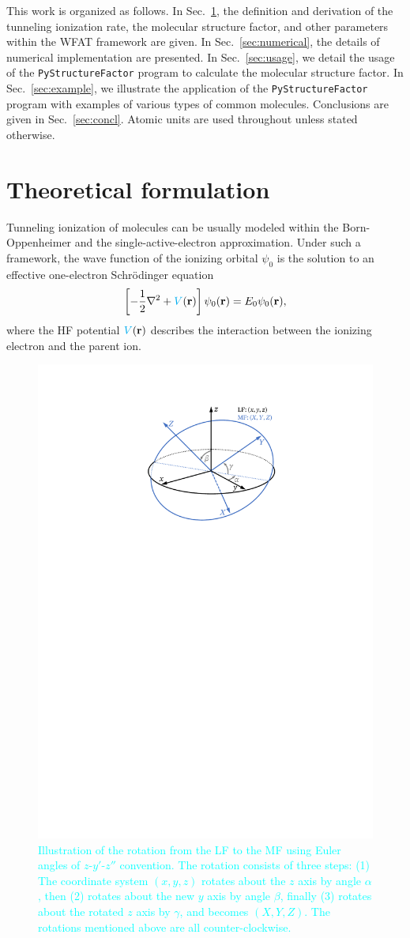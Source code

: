 \documentclass[preprint,12pt]{elsarticle} %
\newcommand{\bn}[1]{\mathbf{#1}}    %
\newcommand{\cyan}[1]{\textcolor{cyan}{#1}}     %
\begin{document}
This work is organized as follows. In Sec.~\ref{sec:theory}, the definition and derivation of the tunneling ionization rate, the molecular structure factor, and other parameters within the WFAT framework are given. In Sec.~\ref{sec:numerical}, the details of numerical implementation are presented. In Sec.~\ref{sec:usage}, we detail the usage of the \texttt{PyStructureFactor} program to calculate the molecular structure factor. In Sec.~\ref{sec:example}, we illustrate the application of the \texttt{PyStructureFactor} program with examples of various types of common molecules. Conclusions are given in Sec.~\ref{sec:concl}. Atomic units are used throughout unless stated otherwise.


\section{Theoretical formulation}
\label{sec:theory}

Tunneling ionization of molecules can be usually modeled within the Born-Oppenheimer and the single-active-electron approximation. Under such a framework, the wave function of the ionizing orbital $\psi_0$ is the solution to an effective one-electron Schr\"{o}dinger equation
\begin{equation}
    \left[-\frac12\nabla^2 + \cyan{V}(\bn{r})\right] \psi_0(\bn{r}) = E_0 \psi_0(\bn{r}),
\end{equation}
where the HF potential $\cyan{V}(\bn{r})$ describes the interaction between the ionizing electron and the parent ion.

\begin{figure}[tb]
    \centering
    \includegraphics[width=0.5\columnwidth]{Euler_Angle_20230706.pdf}
    \caption{\cyan{
        Illustration of the rotation from the LF to the MF using Euler angles of $z$-$y'$-$z''$ convention. The rotation consists of three steps: (1) The coordinate system $(x,y,z)$ rotates about the $z$ axis by angle $\alpha$, then (2) rotates about the new $y$ axis by angle $\beta$, finally (3) rotates about the rotated $z$ axis by $\gamma$, and becomes $(X,Y,Z)$. The rotations mentioned above are all counter-clockwise.
        }}
    \label{fig:EulerAngle}
\end{figure}
\end{document}
